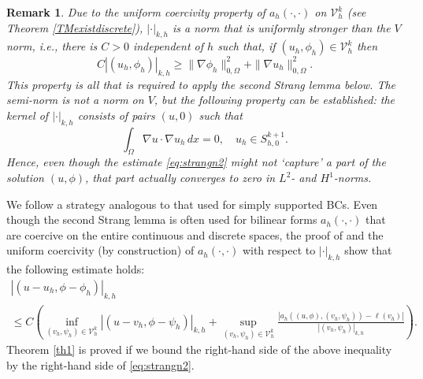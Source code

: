 \documentclass[a4paper,final]{siamltex}
\newtheorem{remark}[theorem]{Remark}
\newcommand{\CV}{\mathcal{V}}
\def\snorm#1#2{|#1|_{#2}}
\begin{document}
\begin{remark}
Due to the uniform coercivity property of $a_h(\cdot,\cdot)$ on $\CV^k_h$ (see Theorem \ref{TMexistdiscrete}),
$\snorm{\cdot}{k,h}$ is a norm that is uniformly stronger than the $V$ norm, i.e.,
there is $C>0$ independent of $h$ such that, if $( u_h,\phi_h)\in \CV^k_h$ then 
\[
C\snorm{(u_h,\phi_h)}{k,h} \geq  \|\nabla \phi_h \|^2_{0,\Omega}  + \|\nabla u_h \|^2_{0,\Omega}.
\]
This property is all that is required to apply the second Strang lemma below. The semi-norm is not
a norm on $V$, but the following property can be established:
the kernel of $\snorm{\cdot}{k,h}$ consists of pairs $(u,0)$ such that
\[ \int_{\Omega} \nabla u \cdot \nabla u_h\,dx = 0,\quad u_h \in S_{h,0}^{k+1}.\]
Hence, even though the estimate \eqref{eq:strangn2}
might not `capture' a part of the solution $(u,\phi)$, that part actually converges to zero in $L^2$- and $H^1$-norms.
\end{remark}

We follow a strategy analogous to that used for simply supported BCs. 
Even though the second Strang lemma is often used for bilinear
forms $a_h(\cdot,\cdot)$ that are coercive on the entire continuous and discrete spaces,
the proof of \cite[Lemma 1.2, Chap. III, \S{} 1]{Bra01} and the uniform
coercivity (by construction) of $a_h(\cdot,\cdot)$ with respect to $\snorm{\cdot}{k,h}$ show that the following estimate holds:
\begin{multline} \label{eq:strang2}
\snorm{(u-u_h,\phi-\phi_h)}{k,h} \\
\leq 
C\left(\inf_{(v_h,\psi_h) \in \CV^k_h} \snorm{(u-v_h,\phi-\psi_h)}{k,h}
+\sup_{(v_h,\psi_h) \in \CV^k_h} \frac{|a_h((u,\phi), (v_h,\psi_h))-\ell(v_h)|}
{\snorm{(v_h,\psi_h)}{k,h}}\right).
\end{multline}
Theorem \ref{th1} is proved if
we bound the right-hand side of the above inequality by the
right-hand side of \eqref{eq:strangn2}.
\end{document}
